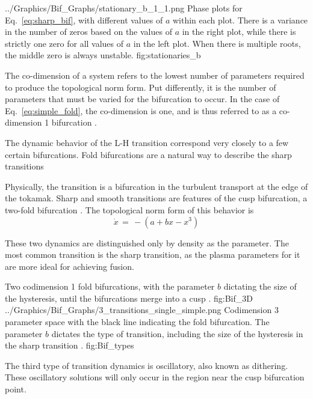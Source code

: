 	{../Graphics/Bif_Graphs/stationary_b_1_1.png}
	{Phase plots for Eq.~\ref{eq:sharp_bif}, with different values of $a$ within each plot. %
	There is a variance in the number of zeros based on the values of $a$ in the right plot, while there is strictly one zero for all values of $a$ in the left plot. %
	When there is multiple roots, the middle zero is always unstable.}
	{fig:stationaries_b}

The co-dimension of a system refers to the lowest number of parameters required to produce the topological norm form.
Put differently, it is the number of parameters that must be varied for the bifurcation to occur.
In the case of Eq.~\ref{eq:simple_fold}, the co-dimension is one, and is thus referred to as a co-dimension 1 bifurcation \cite{weymiens_bifurcation_2014}.

\todo{\color{red}{FIX HERE!}}
The dynamic behavior of the L-H transition correspond very closely to a few certain bifurcations.
Fold bifurcations are a natural way to describe the sharp transitions

Physically, the transition is a bifurcation in the turbulent transport at the edge of the tokamak.
Sharp and smooth transitions are features of the cusp bifurcation, a two-fold bifurcation \cite{weymiens_bifurcation_2014}. 
The topological norm form of this behavior is
\begin{equation}
	\dot{x} \,=\, -(a + bx - x^3)
	\label{eq:sharp_bif}
\end{equation}

These two dynamics are distinguished only by density as the parameter.
The most common transition is the sharp transition, as the plasma parameters for it are more ideal for achieving fusion.

	{Two codimension 1 fold bifurcations, with the parameter $b$ dictating the size of the hysteresis, until the bifurcations merge into a cusp \cite{weymiens_bifurcation_2014}.}
	{fig:Bif_3D}
	{../Graphics/Bif_Graphs/3_transitions_single_simple.png}
	{Codimension 3 parameter space with the black line indicating the fold bifurcation. The parameter $b$ dictates the type of transition, including the size of the hysteresis in the sharp transition \cite{weymiens_bifurcation_2014}.}
	{fig:Bif_types}

The third type of transition dynamics is oscillatory, also known as dithering.
These oscillatory solutions will only occur in the region near the cusp bifurcation point.

